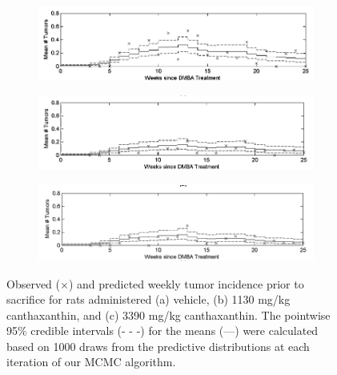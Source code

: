 \documentclass[10pt, letterpaper]{article}
\begin{document}
\begin{figure}[htbp]
    \centering
     \begin{subfigure}[b]{0.8\textwidth}
        \includegraphics[width=\textwidth]{figure3a.png} %
        \caption{}
        \label{fig:3a}
    \end{subfigure}
    \vfill
    \begin{subfigure}[b]{0.8\textwidth}
        \includegraphics[width=\textwidth]{figure3b.png} %
        \caption{}
        \label{fig:3b}
    \end{subfigure}
     \vfill
     \begin{subfigure}[b]{0.8\textwidth}
        \includegraphics[width=\textwidth]{figure3c.png} %
        \caption{}
        \label{fig:3c}
    \end{subfigure}
    \caption{Observed ($\times$) and predicted weekly tumor incidence prior to sacrifice for rats administered (a) vehicle, (b) 1130 mg/kg canthaxanthin, and (c) 3390 mg/kg canthaxanthin. The pointwise 95\% credible intervals (- - -) for the means (---) were calculated based on 1000 draws from the predictive distributions at each iteration of our MCMC algorithm.}
    \label{fig:3}
\end{figure}
\end{document}
